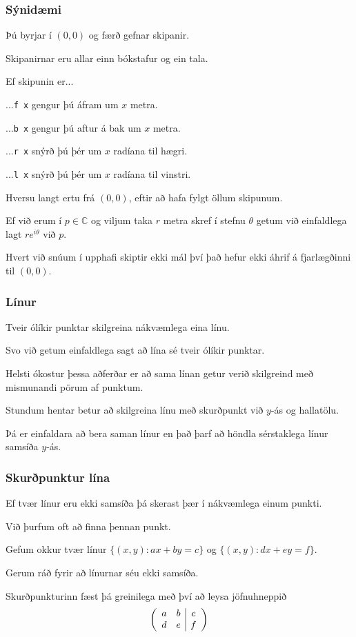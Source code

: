 {
	\frametitle{Sýnidæmi}
	{
		\item<1-> Þú byrjar í $(0, 0)$ og færð gefnar skipanir.
		\item<2-> Skipanirnar eru allar einn bókstafur og ein tala.
		\item<3-> Ef skipunin er...
		{
			\item<4-> ...\texttt{f x} gengur þú áfram um $x$ metra.
			\item<5-> ...\texttt{b x} gengur þú aftur á bak um $x$ metra.
			\item<6-> ...\texttt{r x} snýrð þú þér um $x$ radíana til hægri.
			\item<7-> ...\texttt{l x} snýrð þú þér um $x$ radíana til vinstri.
		}
		\item<8-> Hversu langt ertu frá $(0, 0)$, eftir að hafa fylgt öllum skipunum.
	}
}

{
	{
		\item<1-> Ef við erum í $p \in \mathbb{C}$ og viljum taka $r$ metra skref í stefnu $\theta$ getum við einfaldlega lagt $re^{i\theta}$ við $p$.
		\item<2-> Hvert við snúum í upphafi skiptir ekki mál því það hefur ekki áhrif á fjarlægðinni til $(0, 0)$.
	}
}

{
}

{
	\frametitle{Línur}
	{
		\item<1-> Tveir ólíkir punktar skilgreina nákvæmlega eina línu.
		\item<2-> Svo við getum einfaldlega sagt að lína sé tveir ólíkir punktar.
		\item<3-> Helsti ókostur þessa aðferðar er að sama línan getur verið skilgreind með mismunandi pörum af punktum.
		\item<4-> Stundum hentar betur að skilgreina línu með skurðpunkt við $y$-ás og hallatölu. 
		\item<5-> Þá er einfaldara að bera saman línur en það þarf að höndla sérstaklega línur samsíða $y$-ás.
	}
}

\iffalse

{
	\frametitle{Skurðpunktur lína}
	{
		\item<1-> Ef tvær línur eru ekki samsíða þá skerast þær í nákvæmlega einum punkti.
		\item<2-> Við þurfum oft að finna þennan punkt.
		\item<3-> Gefum okkur tvær línur $\{(x, y) : ax + by=c\}$ og $\{(x, y) : dx + ey=f\}$.
		\item<4-> Gerum ráð fyrir að línurnar séu ekki samsíða.
		\item<5-> Skurðpunkturinn fæst þá greinilega með því að leysa jöfnuhneppið
			\[
				\left (
				\begin{array}{c c | c}
					a & b & c\\
					d & e & f
				\end{array}
				\right )
			\]
	}
}

